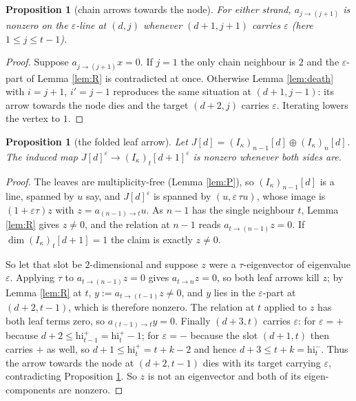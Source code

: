 \documentclass[reqno]{amsart}
\theoremstyle{plain}
\newtheorem{proposition}[theorem]{Proposition}
\theoremstyle{definition}
\newcommand{\ka}{\kappa}
\newcommand{\eps}{\varepsilon}
\newcommand{\hi}{\mathrm{hi}}
\begin{document}
\begin{proposition}[chain arrows towards the node]\label{prop:W4out}
For either strand, $a_{j\to(j+1)}$ is nonzero on the $\eps$-line at $(d,j)$
whenever $(d+1,j+1)$ carries $\eps$ \textup{(}here $1\le j\le t-1$\textup{)}.
\end{proposition}

\begin{proof}
Suppose $a_{j\to(j+1)}x=0$.  If $j=1$ the only chain neighbour is $2$ and the
$\eps$-part of Lemma \ref{lem:R} is contradicted at once.  Otherwise Lemma
\ref{lem:death} with $i=j+1$, $i'=j-1$ reproduces the same situation at
$(d+1,j-1)$: its arrow towards the node dies and the target $(d+2,j)$ carries $\eps$.
Iterating lowers the vertex to $1$.
\end{proof}

\begin{proposition}[the folded leaf arrow]\label{prop:W4l}
Let $J[d]=(I_\ka)_{n-1}[d]\oplus(I_\ka)_n[d]$.  The induced map
$J[d]^{\eps}\to(I_\ka)_t[d+1]^{\eps}$ is nonzero whenever both sides are.
\end{proposition}

\begin{proof}
The leaves are multiplicity-free (Lemma \ref{lem:P}), so $(I_\ka)_{n-1}[d]$ is
a line, spanned by $u$ say, and $J[d]^{\eps}$ is spanned by
$(u,\eps\,\tau u)$, whose image is $(1+\eps\tau)z$ with $z=a_{(n-1)\to t}u$.
As $n-1$ has the single neighbour $t$, Lemma \ref{lem:R} gives $z\ne0$, and the
relation at $n-1$ reads $a_{t\to(n-1)}z=0$.  If $\dim(I_\ka)_t[d+1]=1$ the
claim is exactly $z\ne0$.

So let that slot be $2$-dimensional and suppose $z$ were a $\tau$-eigenvector
of eigenvalue $\eps$.  Applying $\tau$ to $a_{t\to(n-1)}z=0$ gives
$a_{t\to n}z=0$, so both leaf arrows kill $z$; by Lemma \ref{lem:R} at $t$,
$y:=a_{t\to(t-1)}z\ne0$, and $y$ lies in the $\eps$-part at $(d+2,t-1)$, which
is therefore nonzero.  The relation at $t$ applied to $z$ has both leaf terms
zero, so $a_{(t-1)\to t}y=0$.  Finally $(d+3,t)$ carries $\eps$: for $\eps=+$
because $d+2\le\hi^{+}_{t-1}=\hi^{+}_t-1$; for $\eps=-$ because the slot
$(d+1,t)$ then carries $+$ as well, so $d+1\le\hi^{+}_t=t+k-2$ and hence
$d+3\le t+k=\hi^{-}_t$.  Thus the arrow towards the node at $(d+2,t-1)$ dies with its
target carrying $\eps$, contradicting Proposition \ref{prop:W4out}.  So $z$ is
not an eigenvector and both of its eigen-components are nonzero.
\end{proof}
\end{document}
